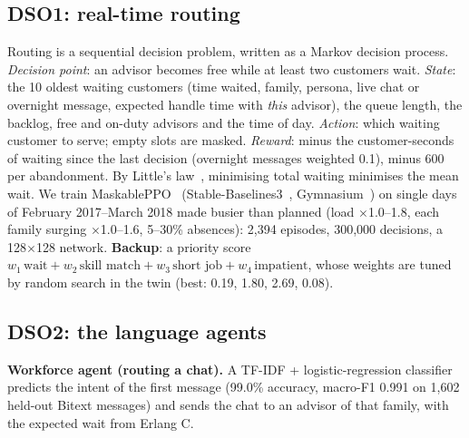 \subsection{DSO1: real-time routing}
Routing is a sequential decision problem, written as a Markov decision process. \emph{Decision point}: an
advisor becomes free while at least two customers wait. \emph{State}: the 10 oldest waiting customers (time
waited, family, persona, live chat or overnight message, expected handle time with \emph{this} advisor), the
queue length, the backlog, free and on-duty advisors and the time of day. \emph{Action}: which waiting
customer to serve; empty slots are masked. \emph{Reward}: minus the customer-seconds of waiting since the last
decision (overnight messages weighted 0.1), minus 600 per abandonment. By Little's law~\cite{little},
minimising total waiting minimises the mean wait.
We train MaskablePPO~\cite{ppo,masking} (Stable-Baselines3~\cite{sb3}, Gymnasium~\cite{gymnasium}) on single
days of February 2017--March 2018 made busier than planned (load $\times$1.0--1.8, each family surging
$\times$1.0--1.6, 5--30\% absences): 2,394 episodes, 300,000 decisions, a 128$\times$128 network.
\textbf{Backup}: a priority score $w_1\,\text{wait} + w_2\,\text{skill match} + w_3\,\text{short job} +
w_4\,\text{impatient}$, whose weights are tuned by random search in the twin (best: 0.19, 1.80, 2.69, 0.08).

\subsection{DSO2: the language agents}
\textbf{Workforce agent (routing a chat).} A TF-IDF + logistic-regression classifier~\cite{sklearn} predicts the
intent of the first message (99.0\% accuracy, macro-F1 0.991 on 1,602 held-out Bitext messages) and sends the
chat to an advisor of that family, with the expected wait from Erlang C.


